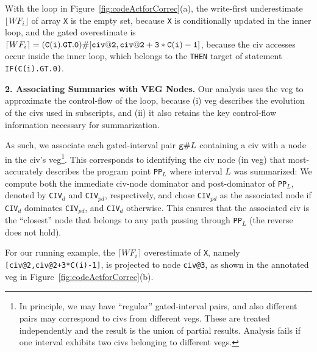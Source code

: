 \documentclass[10pt,nocopyrightspace]{sigplanconf}
\begin{document}
With the loop in Figure~\ref{fig:codeActforCorrec}(a), 
the write-first underestimate $\lfloor WF_i\rfloor$ of array {\tt X} 
is the empty set, because {\tt X} is conditionally updated in 
the inner loop, and the gated overestimate is  
$\lceil WF_i\rceil={\tt{}(C(i).GT.0)}\#[{\tt civ@2, civ@2+3*C(i)-1}]$,
because the {\sc civ} accesses occur inside the inner loop, which
belongs to the {\tt THEN} target of statement {\tt IF(C(i).GT.0)}.
 
\vspace{1ex}

{\bf 2. Associating Summaries with VEG Nodes.}
Our analysis uses the {\sc veg} to approximate the control-flow of
the loop, because (i) {\sc veg} describes the evolution of the 
{\sc civ}s used in subscripts, and (ii) it also retains the 
key control-flow information necessary for summarization. 

As such, we associate each gated-interval pair ${\tt g}\#L$ 
containing a {\sc civ} with a node in the {\sc civ}'s {\sc veg}\footnote{  
In principle, we may have ``regular'' gated-interval pairs, and also 
different pairs may correspond to {\sc civ}s from different {\sc veg}s. 
These are treated independently and the result is the union of partial results.
Analysis fails if one interval exhibits two {\sc civ}s belonging
to different {\sc veg}s.}. 
This corresponds to identifying the {\sc civ} node (in {\sc veg})
that most-accurately describes the program point {\tt PP$_L$} 
where interval $L$ was summarized:
%
We compute both the immediate {\sc civ}-node dominator and 
post-dominator of {\tt PP$_L$}, denoted by {\tt CIV}$_{d}$ and 
{\tt CIV}$_{pd}$, respectively, and chose {\tt CIV}$_{pd}$
as the associated node if {\tt CIV}$_{d}$ dominates {\tt CIV}$_{pd}$, 
and {\tt CIV}$_{d}$ otherwise. This ensures that the associated {\sc civ}
is the ``closest'' node that belongs to any path passing through {\tt PP$_L$}
(the reverse does not hold).

For our running example, the $\lceil WF_i\rceil$ overestimate of {\tt X}, 
namely {\tt [civ@2,civ@2+3*C(i)-1]}, is projected to node {\tt civ@3}, 
as shown in the annotated {\sc veg} in Figure~\ref{fig:codeActforCorrec}(b).
%
\end{document}
